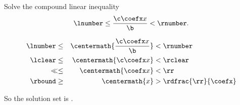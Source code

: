 



\pgfmathtruncatemacro{\c}{\lnumber*\b-\coefx*\rbound}




\pgfmathtruncatemacro{\lclear}{\lnumber*\b}
\pgfmathtruncatemacro{\rclear}{\rnumber*\b}

\pgfmathtruncatemacro{\ll}{\lclear-\c}
\pgfmathtruncatemacro{\rr}{\rclear-\c}


\pgfmathsetmacro{\detr}{\rbound-\rr/\coefx} 






Solve the compound linear inequality 
\[\lnumber\leq \frac{\c \coefx x}{\b} < \rnumber.\]



\begin{solution}
\begin{alignat*}{2}
\lnumber\leq  &&
				\centermath{ \frac{\c \coefx x}{\b}  }
													& < \rnumber\\
\lclear \leq  && 
				\centermath{ \c \coefx x }
										&<\rclear \\
\ll\leq  &&
			\centermath{ \coefx x } 
								& <\rr \\
\rbound\geq  &&
			\centermath{ x } 
							& >
									\rdfrac{\rr}{\coefx}\\
\end{alignat*}

So the solution set is 
\ifdim \detr pt>0 pt 
	$( \rdfrac{\rr}{\coefx},\rbound ]$ 
\else 
	$\emptyset$ 
\fi.

\end{solution}
